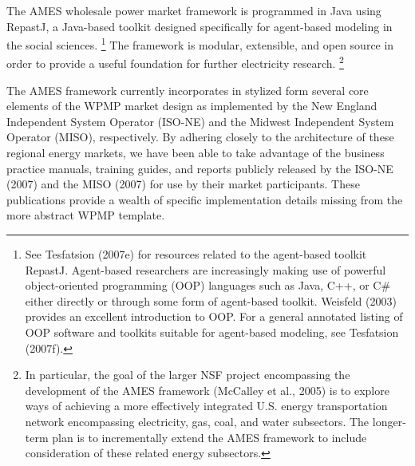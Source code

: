 \documentclass[12pt]{article}
\begin{document}
   The AMES wholesale power market framework is programmed in Java using RepastJ, 
a Java-based toolkit designed specifically for agent-based modeling in the social sciences.%
    \footnote{See Tesfatsion (2007e) for resources related to the agent-based toolkit RepastJ.  Agent-based researchers are increasingly making use of powerful object-oriented programming (OOP) languages such as Java, C++, or C\# either directly or through some form of agent-based toolkit.  Weisfeld (2003) provides an excellent introduction to OOP. 
For a general annotated listing of OOP software and toolkits suitable for agent-based modeling, see Tesfatsion (2007f).}
   The framework is modular, extensible, and open source in order to provide a useful foundation for further electricity research.%
       \footnote{In particular, the goal of the larger NSF project encompassing the development of the AMES framework (McCalley et al., 2005) is to explore ways of achieving a more effectively integrated U.S. energy transportation network encompassing electricity, gas, coal, and water subsectors.  The longer-term plan is to incrementally extend the AMES framework to include consideration of these related energy subsectors.}

The AMES framework currently incorporates in
stylized form several core elements of the WPMP market design as implemented
by the New England Independent System Operator (ISO-NE) and the 
Midwest Independent System Operator (MISO), respectively.
By adhering closely to the architecture of these regional energy markets, we have been able to take
advantage of the business practice manuals, training guides, and
reports publicly released by the ISO-NE (2007) and the MISO (2007) for use by their market participants.  
These publications provide a
wealth of specific implementation details missing from the more abstract WPMP
template.
\end{document}
